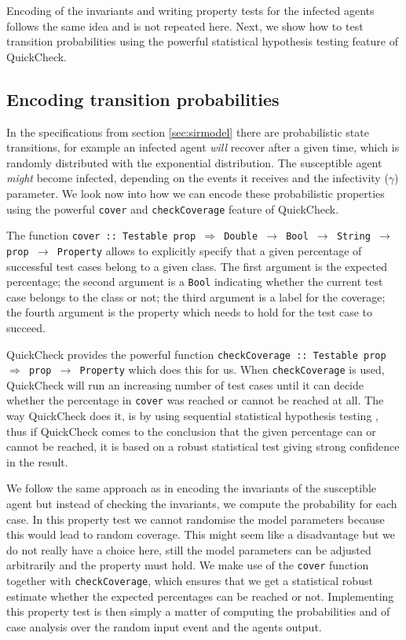 Encoding of the invariants and writing property tests for the infected agents follows the same idea and is not repeated here. Next, we show how to test transition probabilities using the powerful statistical hypothesis testing feature of QuickCheck.

\subsection{Encoding transition probabilities}
In the specifications from section \ref{sec:sirmodel} there are probabilistic state transitions, for example an infected agent \textit{will} recover after a given time, which is randomly distributed with the exponential distribution. The susceptible agent \textit{might} become infected, depending on the events it receives and the infectivity ($\gamma$) parameter. We look now into how we can encode these probabilistic properties using the powerful \texttt{cover} and \texttt{checkCoverage} feature of QuickCheck.

The function \texttt{cover :: Testable prop $\Rightarrow$ Double $\rightarrow$ Bool $\rightarrow$ String $\rightarrow$ prop $\rightarrow$ Property} allows to explicitly specify that a given percentage of successful test cases belong to a given class. The first argument is the expected percentage; the second argument is a \texttt{Bool} indicating whether the current test case belongs to the class or not; the third argument is a label for the coverage; the fourth argument is the property which needs to hold for the test case to succeed. 

QuickCheck provides the powerful function \texttt{checkCoverage :: Testable prop $\Rightarrow$ prop $\rightarrow$ Property} which does this for us. When \texttt{checkCoverage} is used, QuickCheck will run an increasing number of test cases until it can decide whether the percentage in \texttt{cover} was reached or cannot be reached at all. The way QuickCheck does it, is by using sequential statistical hypothesis testing \cite{wald_sequential_1992}, thus if QuickCheck comes to the conclusion that the given percentage can or cannot be reached, it is based on a robust statistical test giving strong confidence in the result.

We follow the same approach as in encoding the invariants of the susceptible agent but instead of checking the invariants, we compute the probability for each case. In this property test we cannot randomise the model parameters because this would lead to random coverage. This might seem like a disadvantage but we do not really have a choice here, still the model parameters can be adjusted arbitrarily and the property must hold. %
We make use of the \texttt{cover} function together with \texttt{checkCoverage}, which ensures that we get a statistical robust estimate whether the expected percentages can be reached or not. Implementing this property test is then simply a matter of computing the probabilities and of case analysis over the random input event and the agents output.

